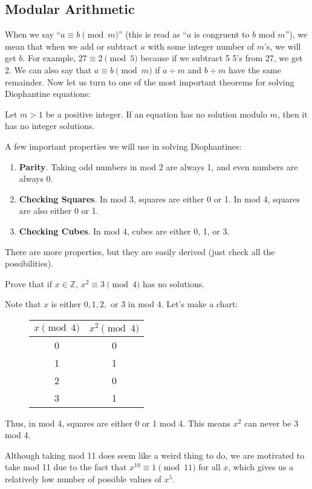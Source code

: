 \documentclass{article}
\begin{document}
\subsection{Modular Arithmetic}
When we say ``$a\equiv b\pmod{m}$'' (this is read as ``$a$ is congruent to $b$ mod $m$''), we mean that when we add or subtract $a$ with some integer number of $m$'s, we will get $b$. For example, $27\equiv 2\pmod{5}$ because if we subtract 5 5's from 27, we get 2. We can also say that $a\equiv b\pmod{m}$ if $a\div m$ and $b\div m$ have the same remainder. Now let us turn to one of the most important theorems for solving Diophantine equations:
\begin{theo} 
Let $m>1$ be a positive integer. If an equation has no solution modulo $m$, then it has no integer solutions.
\end{theo}
A few important properties we will use in solving Diophantines:
\begin{enumerate}
\item \textbf{Parity}. Taking odd numbers in mod 2 are always 1, and even numbers are always 0.
\item \textbf{Checking Squares}. In mod 3, squares are either 0 or 1. In mod 4, squares are also either 0 or 1. 
\item \textbf{Checking Cubes}. In mod 4, cubes are either 0, 1, or 3. 
\end{enumerate}
There are more properties, but they are easily derived (just check all the possibilities). 
\begin{exam}[Folklore]
Prove that if $x\in\mathbb{Z}$, $x^2\equiv 3\pmod{4}$ has no solutions.
\end{exam}
\begin{sol}
Note that $x$ is either $0,1,2,$ or 3 in mod 4. Let's make a chart:
\begin{figure}[H]
\centering
\begin{tabular}{c|c}
    $x\pmod{4}$ & $x^2\pmod{4}$\\
    \hline
    0 & 0\\
    1 & 1\\
    2 & 0\\
    3 & 1\\
\end{tabular}
\end{figure}
\noindent
Thus, in mod 4, squares are either 0 or 1 mod 4. This means $x^2$ can never be 3 mod 4.
\end{sol}
\begin{remark}
Although taking mod 11 does seem like a weird thing to do, we are motivated to take mod 11 due to the fact that $x^{10}\equiv1\pmod{11}$ for all $x$, which gives us a relatively low number of possible values of $x^5$.
\end{remark}
\end{document}
